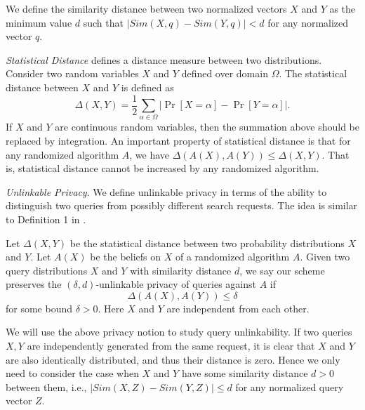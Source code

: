 \documentclass{article}
\begin{document}
We define the similarity distance between two normalized vectors $X$ and $Y$ as the minimum value $d$ such that $|Sim(X, q) - Sim(Y, q)|<d$ for any normalized vector $q$.

\emph{Statistical Distance} \cite{AB09,G95} defines a distance measure between two distributions. Consider two random variables $X$ and $Y$ defined over domain $\Omega$. The statistical distance between $X$ and $Y$ is defined as
$$\Delta(X,Y) = \frac{1}{2}\sum_{\alpha\in\Omega} |\Pr[X=\alpha] - \Pr[Y=\alpha]|.$$
If $X$ and $Y$ are continuous random variables, then the summation above should be replaced by integration.
An important property of statistical distance is that for any randomized algorithm $A$, we have $\Delta(A(X),A(Y))\leq\Delta(X,Y)$. That is, statistical distance cannot be increased by any randomized algorithm.

\emph{Unlinkable Privacy}. We define unlinkable privacy in terms of the ability to distinguish two queries from possibly different search requests. The idea is similar to Definition 1 in \cite{K09}.
\begin{definition}
Let $\Delta(X, Y)$ be the statistical distance between two probability distributions $X$ and $Y$. Let $A(X)$ be the beliefs on $X$ of a randomized algorithm $A$. Given two query distributions $X$ and $Y$ with similarity distance $d$, we say our scheme preserves the $(\delta, d)$-unlinkable privacy of queries against $A$ if
$$\Delta(A(X), A(Y)) \leq \delta$$
for some bound $\delta > 0$. Here $X$ and $Y$ are independent from each other.
\end{definition}
We will use the above privacy notion to study query unlinkability. 
If two queries $X, Y$ are independently generated from the same request, it is clear that $X$ and $Y$ are also identically distributed, and thus their distance is zero. Hence we only need to consider the case when $X$ and $Y$ have some similarity distance $d>0$ between them, i.e., $|Sim(X, Z) - Sim(Y,Z)| \leq d$ for any normalized query vector $Z$.
\end{document}
